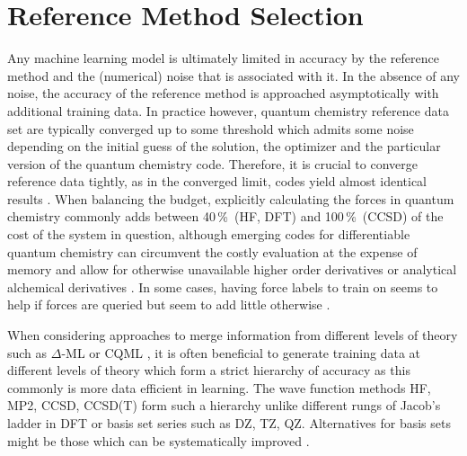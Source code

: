 \documentclass[9pt,bestpractices]{livecoms}
\begin{document}



\section{Reference Method Selection}
Any machine learning model is ultimately limited in accuracy by the reference
method and the (numerical) noise that is associated with it. In the absence of
any noise, the accuracy of the reference method is approached asymptotically
with additional training data. In practice however, quantum chemistry reference
data set are typically converged up to some threshold which admits some noise
depending on the initial guess of the solution, the optimizer and the particular
version of the quantum chemistry code. Therefore, it is crucial to converge
reference data tightly, as in the converged limit, codes yield almost identical
results \cite{lejaeghereReproducibilityDensityFunctional2016a}. When balancing
the budget, explicitly calculating the forces in quantum chemistry commonly adds
between 40\,\%\ (HF, DFT) and 100\,\%\ (CCSD) of the cost of the system in
question, although emerging codes for differentiable quantum
chemistry \cite{tamayo-mendozaAutomaticDifferentiationQuantum2018b} can
circumvent the costly evaluation at the expense of memory and allow for
otherwise unavailable higher order
derivatives \cite{abbottArbitraryOrderDerivativesQuantum2021} or analytical
alchemical derivatives \cite{kasimDQCPythonProgram2022}. In some cases, having
force labels to train on seems to help if forces are queried but seem to add
little otherwise \cite{christensenRoleGradientsMachine2020a}.

When considering approaches to merge information from different levels of theory
such as $\Delta$-ML \cite{ramakrishnanBigDataMeets2015} or
CQML \cite{zaspelBoostingQuantumMachine2019}, it is often beneficial to generate
training data at different levels of theory which form a strict hierarchy of
accuracy as this commonly is more data efficient in learning. The wave function
methods HF, MP2, CCSD, CCSD(T) form such a hierarchy unlike different rungs of
Jacob's ladder in DFT \cite{perdewJacobLadderDensity2001a} or basis set series
such as DZ, TZ, QZ. Alternatives for basis sets might be those which can be
systematically improved \cite{emalopezSeriallyImprovedGTOs2023}.
\end{document}

